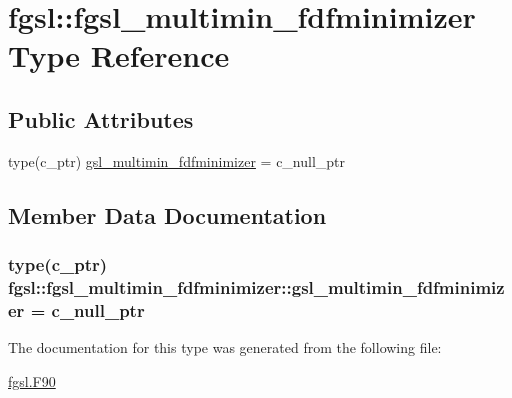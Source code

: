 \hypertarget{structfgsl_1_1fgsl__multimin__fdfminimizer}{\section{fgsl\-:\-:fgsl\-\_\-multimin\-\_\-fdfminimizer Type Reference}
\label{structfgsl_1_1fgsl__multimin__fdfminimizer}
}
\subsection*{Public Attributes}
\begin{DoxyCompactItemize}
\item 
type(c\-\_\-ptr) \hyperlink{structfgsl_1_1fgsl__multimin__fdfminimizer_a02b408d8e6502743bfa179d7b62791b0}{gsl\-\_\-multimin\-\_\-fdfminimizer} = c\-\_\-null\-\_\-ptr
\end{DoxyCompactItemize}


\subsection{Member Data Documentation}
\hypertarget{structfgsl_1_1fgsl__multimin__fdfminimizer_a02b408d8e6502743bfa179d7b62791b0}{
\subsubsection[{gsl\-\_\-multimin\-\_\-fdfminimizer}]{\setlength{\rightskip}{0pt plus 5cm}type(c\-\_\-ptr) fgsl\-::fgsl\-\_\-multimin\-\_\-fdfminimizer\-::gsl\-\_\-multimin\-\_\-fdfminimizer = c\-\_\-null\-\_\-ptr}}\label{structfgsl_1_1fgsl__multimin__fdfminimizer_a02b408d8e6502743bfa179d7b62791b0}


The documentation for this type was generated from the following file\-:\begin{DoxyCompactItemize}
\item 
\hyperlink{fgsl_8F90}{fgsl.\-F90}\end{DoxyCompactItemize}

